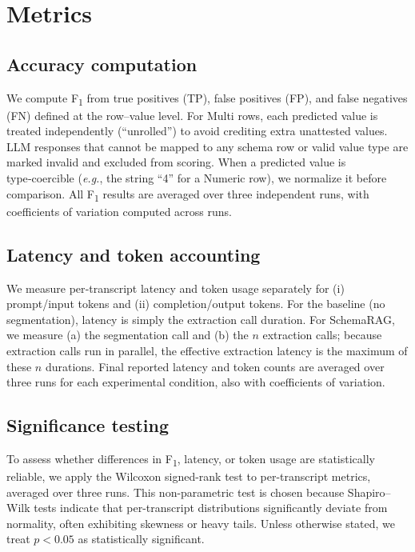 \section{Metrics}
\label{sec:metrics}

\subsection{Accuracy computation}
We compute F\textsubscript{1} from true positives (TP), false positives (FP), and false negatives (FN) defined at the row–value level. 
For Multi rows, each predicted value is treated independently (“unrolled”) to avoid crediting extra unattested values. 
LLM responses that cannot be mapped to any schema row or valid value type are marked invalid and excluded from scoring. 
When a predicted value is type‑coercible (\textit{e.g.}, the string ``4'' for a Numeric row), we normalize it before comparison. 
All F\textsubscript{1} results are averaged over three independent runs, with coefficients of variation computed across runs.

\subsection{Latency and token accounting}
We measure per‑transcript latency and token usage separately for (i) prompt/input tokens and (ii) completion/output tokens.
For the baseline (no segmentation), latency is simply the extraction call duration.
For SchemaRAG, we measure (a) the segmentation call and (b) the $n$ extraction calls; because extraction calls run in parallel, the effective extraction latency is the maximum of these $n$ durations.
Final reported latency and token counts are averaged over three runs for each experimental condition, also with coefficients of variation.

\subsection{Significance testing}
To assess whether differences in F\textsubscript{1}, latency, or token usage are statistically reliable, we apply the Wilcoxon signed-rank test \cite{wilcoxon1992individual} to per-transcript metrics, averaged over three runs. 
This non-parametric test is chosen because Shapiro–Wilk tests \cite{shapiro1965analysis} indicate that per-transcript distributions significantly deviate from normality, often exhibiting skewness or heavy tails.
Unless otherwise stated, we treat $p < 0.05$ as statistically significant.
